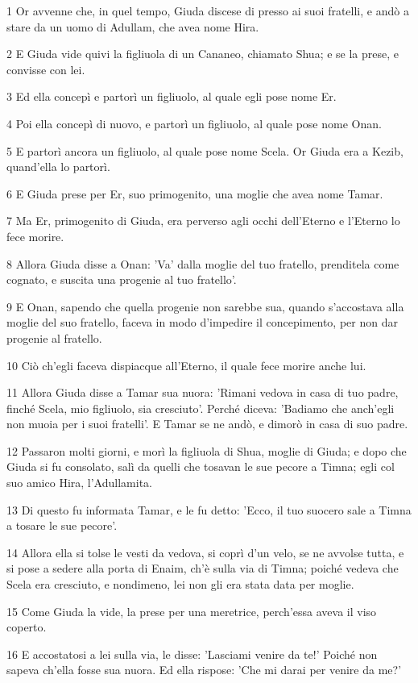 \par 1 Or avvenne che, in quel tempo, Giuda discese di presso ai suoi fratelli, e andò a stare da un uomo di Adullam, che avea nome Hira.
\par 2 E Giuda vide quivi la figliuola di un Cananeo, chiamato Shua; e se la prese, e convisse con lei.
\par 3 Ed ella concepì e partorì un figliuolo, al quale egli pose nome Er.
\par 4 Poi ella concepì di nuovo, e partorì un figliuolo, al quale pose nome Onan.
\par 5 E partorì ancora un figliuolo, al quale pose nome Scela. Or Giuda era a Kezib, quand'ella lo partorì.
\par 6 E Giuda prese per Er, suo primogenito, una moglie che avea nome Tamar.
\par 7 Ma Er, primogenito di Giuda, era perverso agli occhi dell'Eterno e l'Eterno lo fece morire.
\par 8 Allora Giuda disse a Onan: 'Va' dalla moglie del tuo fratello, prenditela come cognato, e suscita una progenie al tuo fratello'.
\par 9 E Onan, sapendo che quella progenie non sarebbe sua, quando s'accostava alla moglie del suo fratello, faceva in modo d'impedire il concepimento, per non dar progenie al fratello.
\par 10 Ciò ch'egli faceva dispiacque all'Eterno, il quale fece morire anche lui.
\par 11 Allora Giuda disse a Tamar sua nuora: 'Rimani vedova in casa di tuo padre, finché Scela, mio figliuolo, sia cresciuto'. Perché diceva: 'Badiamo che anch'egli non muoia per i suoi fratelli'. E Tamar se ne andò, e dimorò in casa di suo padre.
\par 12 Passaron molti giorni, e morì la figliuola di Shua, moglie di Giuda; e dopo che Giuda si fu consolato, salì da quelli che tosavan le sue pecore a Timna; egli col suo amico Hira, l'Adullamita.
\par 13 Di questo fu informata Tamar, e le fu detto: 'Ecco, il tuo suocero sale a Timna a tosare le sue pecore'.
\par 14 Allora ella si tolse le vesti da vedova, si coprì d'un velo, se ne avvolse tutta, e si pose a sedere alla porta di Enaim, ch'è sulla via di Timna; poiché vedeva che Scela era cresciuto, e nondimeno, lei non gli era stata data per moglie.
\par 15 Come Giuda la vide, la prese per una meretrice, perch'essa aveva il viso coperto.
\par 16 E accostatosi a lei sulla via, le disse: 'Lasciami venire da te!' Poiché non sapeva ch'ella fosse sua nuora. Ed ella rispose: 'Che mi darai per venire da me?'
